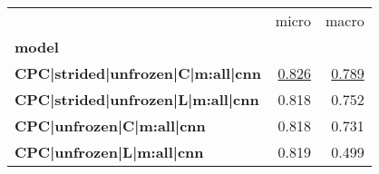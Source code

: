 \begin{adjustbox}{width=\textwidth}
\begin{tabular}{lrr}
\toprule
{} &  micro &  macro \\
\textbf{model                                        } &        &        \\
\midrule
\textbf{CPC|strided|unfrozen|C|m:all|cnn} &  \underline{0.826} &  \underline{0.789} \\
\textbf{CPC|strided|unfrozen|L|m:all|cnn} &  0.818 &  0.752 \\
\textbf{CPC|unfrozen|C|m:all|cnn        } &  0.818 &  0.731 \\
\textbf{CPC|unfrozen|L|m:all|cnn        } &  0.819 &  0.499 \\
\bottomrule
\end{tabular}
\end{adjustbox}